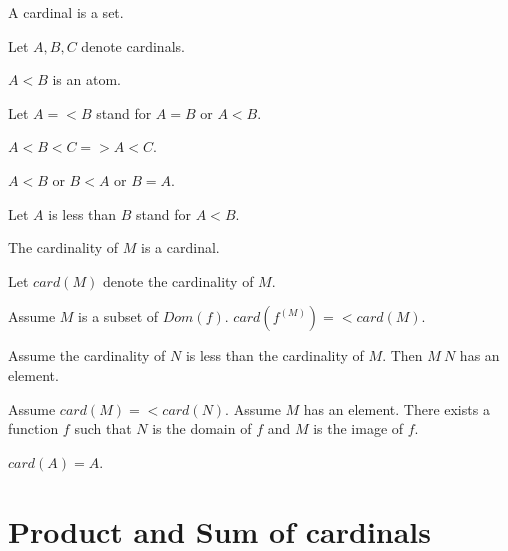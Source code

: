 \documentclass{article}
\begin{document}
  \begin{forthel}
    \begin{signature}
      A cardinal is a set.
    \end{signature}

    Let $A,B,C$ denote cardinals.

    \begin{signature}
      $A < B$ is an atom.
    \end{signature}

    Let $A =< B$ stand for $A = B$ or $A < B$.

    \begin{axiom}
      $A < B < C => A < C$.
    \end{axiom}

    \begin{axiom}
      $A < B$ or $B < A$ or $B = A$.
    \end{axiom}

    Let $A$ is less than $B$ stand for $A < B$.

    \begin{signature}
      The cardinality of $M$ is a cardinal.
    \end{signature}

    Let $card(M)$ denote the cardinality of $M$.

    \begin{axiom}[ImageCard]
      Assume $M$ is a subset of $Dom(f)$. $card(f^(M)) =< card(M)$.
    \end{axiom}

    \begin{axiom}
      Assume the cardinality of $N$ is less than the cardinality of $M$. Then $M \ N$ has an element.
    \end{axiom}

    \begin{axiom}[SurjExi]
      Assume $card(M) =< card(N)$. Assume $M$ has an element. There exists a
      function $f$ such that $N$ is the domain of $f$ and $M$ is the image of $f$.
    \end{axiom}

    \begin{axiom}
      $card(A) = A$.
    \end{axiom}
  \end{forthel}


  \section*{Product and Sum of cardinals}
\end{document}
